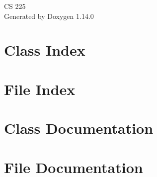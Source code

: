 \documentclass[twoside]{book}
\newcommand{\+}{\discretionary{\mbox{\scriptsize$\hookleftarrow$}}{}{}}
\newcommand{\clearemptydoublepage}{%
    \newpage{\pagestyle{empty}\cleardoublepage}%
  }
\begin{document}
  \raggedbottom
    \hypersetup{pageanchor=false,
                bookmarksnumbered=true,
                pdfencoding=unicode
               }
  \begin{titlepage}
  \vspace*{7cm}
  \begin{center}%
  {\Large CS 225}\\
  \vspace*{1cm}
  {\large Generated by Doxygen 1.14.0}\\
  \end{center}
  \end{titlepage}
  \clearemptydoublepage
  \tableofcontents
  \clearemptydoublepage
  \hypersetup{pageanchor=true}
















\chapter{Class Index}

\chapter{File Index}

\chapter{Class Documentation}



\chapter{File Documentation}




  \backmatter
  \newpage
  \clearemptydoublepage
  \printindex
\end{document}

